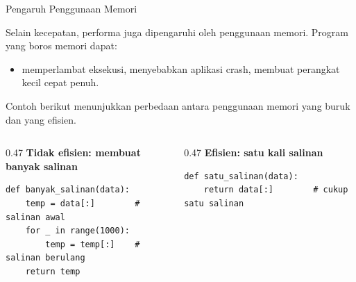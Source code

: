 \documentclass[aspectratio=169, table]{beamer}
\begin{document}
\begin{frame}[fragile]{Pengaruh Penggunaan Memori}
\vspace{8pt}

Selain kecepatan, performa juga dipengaruhi oleh penggunaan memori.
Program yang boros memori dapat:

\begin{itemize}
    \item memperlambat eksekusi, menyebabkan aplikasi crash, membuat perangkat kecil cepat penuh.
\end{itemize}

Contoh berikut menunjukkan perbedaan antara penggunaan memori yang buruk
dan yang efisien.

\begin{columns}[T]

\begin{column}{0.47\linewidth}
\textbf{Tidak efisien: membuat banyak salinan}

\begin{lstlisting}[style=PythonStyle, basicstyle=\ttfamily\scriptsize]
def banyak_salinan(data):
    temp = data[:]        # salinan awal
    for _ in range(1000):
        temp = temp[:]    # salinan berulang
    return temp
\end{lstlisting}
\end{column}

\begin{column}{0.47\linewidth}
\textbf{Efisien: satu kali salinan}

\begin{lstlisting}[style=PythonStyle, basicstyle=\ttfamily\scriptsize]
def satu_salinan(data):
    return data[:]        # cukup satu salinan
\end{lstlisting}
\end{column}

\end{columns}

\end{frame}
\end{document}
